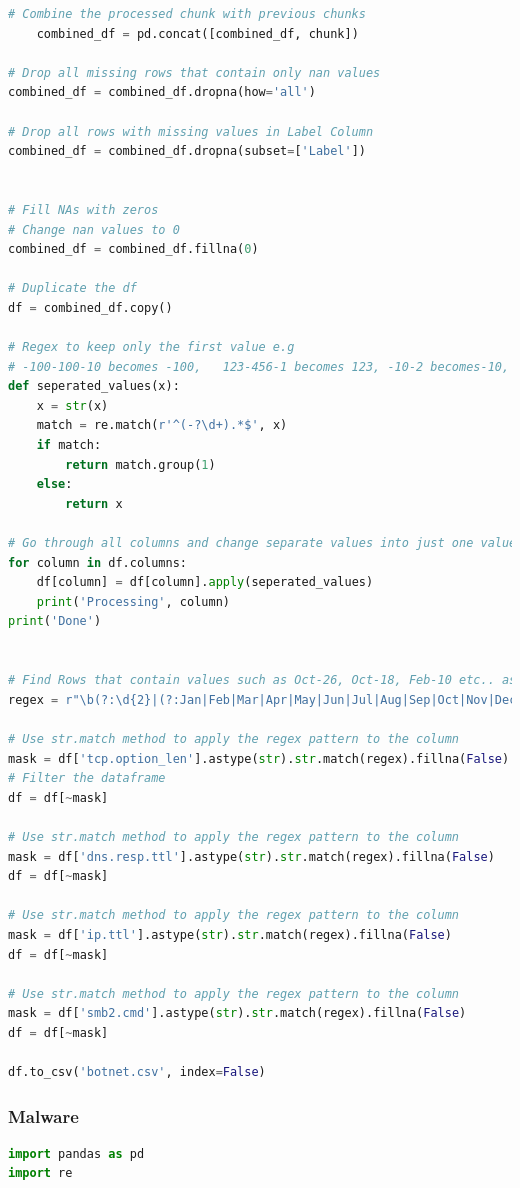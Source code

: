 \begin{appendices}
\begin{lstlisting}[language=Python]
    # Combine the processed chunk with previous chunks
    combined_df = pd.concat([combined_df, chunk])

# Drop all missing rows that contain only nan values
combined_df = combined_df.dropna(how='all')

# Drop all rows with missing values in Label Column
combined_df = combined_df.dropna(subset=['Label'])


# Fill NAs with zeros
# Change nan values to 0
combined_df = combined_df.fillna(0)

# Duplicate the df
df = combined_df.copy()

# Regex to keep only the first value e.g 
# -100-100-10 becomes -100,   123-456-1 becomes 123, -10-2 becomes-10, 81-63-63 becomes 81
def seperated_values(x):
    x = str(x)
    match = re.match(r'^(-?\d+).*$', x)
    if match:
        return match.group(1)
    else:
        return x
    
# Go through all columns and change separate values into just one value
for column in df.columns:
    df[column] = df[column].apply(seperated_values)
    print('Processing', column)
print('Done')


# Find Rows that contain values such as Oct-26, Oct-18, Feb-10 etc.. as these appear to be invalid and we will drop these rows.
regex = r"\b(?:\d{2}|(?:Jan|Feb|Mar|Apr|May|Jun|Jul|Aug|Sep|Oct|Nov|Dec))-(?:\d{2}|(?:Jan|Feb|Mar|Apr|May|Jun|Jul|Aug|Sep|Oct|Nov|Dec))\b"

# Use str.match method to apply the regex pattern to the column
mask = df['tcp.option_len'].astype(str).str.match(regex).fillna(False)
# Filter the dataframe
df = df[~mask]

# Use str.match method to apply the regex pattern to the column
mask = df['dns.resp.ttl'].astype(str).str.match(regex).fillna(False)
df = df[~mask]

# Use str.match method to apply the regex pattern to the column
mask = df['ip.ttl'].astype(str).str.match(regex).fillna(False)
df = df[~mask]

# Use str.match method to apply the regex pattern to the column
mask = df['smb2.cmd'].astype(str).str.match(regex).fillna(False)
df = df[~mask]

df.to_csv('botnet.csv', index=False)
\end{lstlisting}

\subsubsection*{Malware}
\begin{lstlisting}[language=Python]
import pandas as pd
import re


\end{lstlisting}
\end{appendices}
